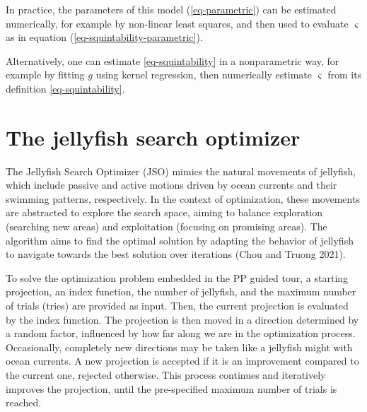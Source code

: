 \documentclass[
  12pt,
]{interact}
\theoremstyle{plain}
\begin{document}
In practice, the parameters of this model (\ref{eq-parametric}) can be
estimated numerically, for example by non-linear least squares, and then
used to evaluate \(\varsigma\) as in equation
(\ref{eq-squintability-parametric}).

Alternatively, one can estimate \eqref{eq-squintability} in a
nonparametric way, for example by fitting \(g\) using kernel regression,
then numerically estimate \(\varsigma\) from its definition
\eqref{eq-squintability}.

\section{The jellyfish search optimizer}\label{sec-JSO}

The Jellyfish Search Optimizer (JSO) mimics the natural movements of
jellyfish, which include passive and active motions driven by ocean
currents and their swimming patterns, respectively. In the context of
optimization, these movements are abstracted to explore the search
space, aiming to balance exploration (searching new areas) and
exploitation (focusing on promising areas). The algorithm aims to find
the optimal solution by adapting the behavior of jellyfish to navigate
towards the best solution over iterations (Chou and Truong 2021).

To solve the optimization problem embedded in the PP guided tour, a
starting projection, an index function, the number of jellyfish, and the
maximum number of trials (tries) are provided as input. Then, the
current projection is evaluated by the index function. The projection is
then moved in a direction determined by a random factor, influenced by
how far along we are in the optimization process. Occasionally,
completely new directions may be taken like a jellyfish might with ocean
currents. A new projection is accepted if it is an improvement compared
to the current one, rejected otherwise. This process continues and
iteratively improves the projection, until the pre-specified maximum
number of trials is reached.
\end{document}
